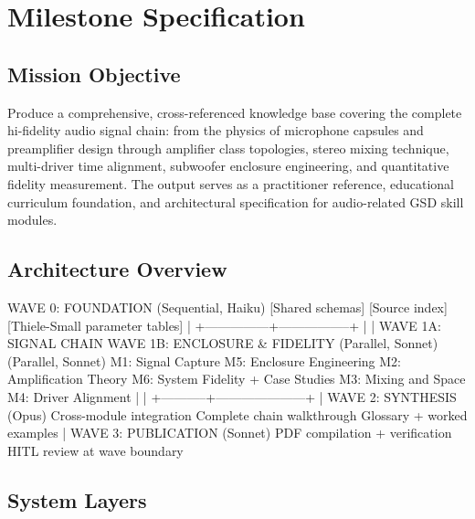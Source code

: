 \documentclass[11pt,letterpaper]{article}
\newcommand{\stageheader}[2]{%
  \noindent\colorbox{#2}{\makebox[\textwidth][l]{%
    \textcolor{white}{\bfseries\sffamily\hspace{6pt}#1\hspace{6pt}}}}%
  \vspace{0.5em}\par%
}
\begin{document}
\newpage

\stageheader{STAGE 3 --- MISSION PACKAGE}{tertiary}

\section{Milestone Specification}

\subsection{Mission Objective}

Produce a comprehensive, cross-referenced knowledge base covering the complete hi-fidelity audio signal chain: from the physics of microphone capsules and preamplifier design through amplifier class topologies, stereo mixing technique, multi-driver time alignment, subwoofer enclosure engineering, and quantitative fidelity measurement. The output serves as a practitioner reference, educational curriculum foundation, and architectural specification for audio-related GSD skill modules.

\subsection{Architecture Overview}

\begin{asciibox}
WAVE 0: FOUNDATION (Sequential, Haiku)
  [Shared schemas] [Source index] [Thiele-Small parameter tables]
                        |
        +---------------+-----------------+
        |                                 |
WAVE 1A: SIGNAL CHAIN            WAVE 1B: ENCLOSURE & FIDELITY
  (Parallel, Sonnet)               (Parallel, Sonnet)
  M1: Signal Capture               M5: Enclosure Engineering
  M2: Amplification Theory         M6: System Fidelity + Case Studies
  M3: Mixing and Space
  M4: Driver Alignment
        |                                 |
        +-----------+---------------------+
                    |
         WAVE 2: SYNTHESIS (Opus)
           Cross-module integration
           Complete chain walkthrough
           Glossary + worked examples
                    |
         WAVE 3: PUBLICATION (Sonnet)
           PDF compilation + verification
           HITL review at wave boundary
\end{asciibox}

\subsection{System Layers}
\end{document}
